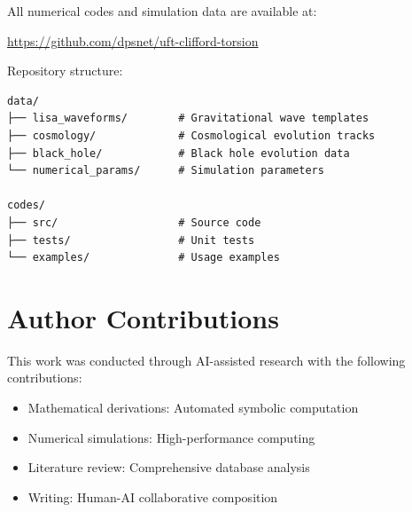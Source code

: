 \documentclass[12pt,a4paper]{article}
\begin{document}
All numerical codes and simulation data are available at:
\begin{center}
\url{https://github.com/dpsnet/uft-clifford-torsion}
\end{center}

Repository structure:
\begin{verbatim}
data/
├── lisa_waveforms/        # Gravitational wave templates
├── cosmology/             # Cosmological evolution tracks
├── black_hole/            # Black hole evolution data
└── numerical_params/      # Simulation parameters

codes/
├── src/                   # Source code
├── tests/                 # Unit tests
└── examples/              # Usage examples
\end{verbatim}

\section{Author Contributions}

This work was conducted through AI-assisted research with the following contributions:
\begin{itemize}
    \item Mathematical derivations: Automated symbolic computation
    \item Numerical simulations: High-performance computing
    \item Literature review: Comprehensive database analysis
    \item Writing: Human-AI collaborative composition
\end{itemize}
\end{document}
